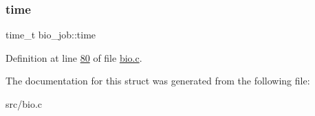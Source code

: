 \subsubsection{\texorpdfstring{time}{time}}
{\footnotesize\ttfamily time\+\_\+t bio\+\_\+job\+::time}



Definition at line \hyperlink{bio_8c_source_l00080}{80} of file \hyperlink{bio_8c_source}{bio.\+c}.



The documentation for this struct was generated from the following file\+:\begin{DoxyCompactItemize}
\item 
src/bio.\+c\end{DoxyCompactItemize}

